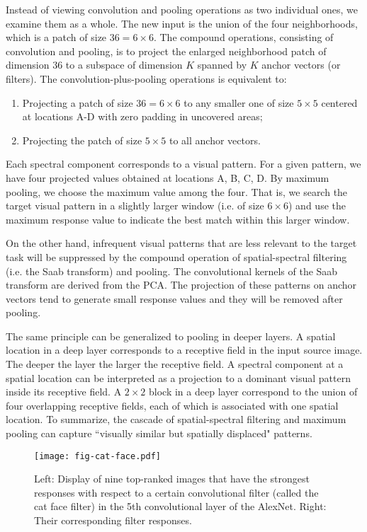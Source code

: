 \documentclass[preprint,12pt]{elsarticle}
\begin{document}
Instead of viewing convolution and pooling operations as two individual
ones, we examine them as a whole.  The new input is the union of the
four neighborhoods, which is a patch of size $36=6 \times 6$. The
compound operations, consisting of convolution and pooling, is to
project the enlarged neighborhood patch of dimension $36$ to a subspace
of dimension $K$ spanned by $K$ anchor vectors (or filters).  The
convolution-plus-pooling operations is equivalent to:
\begin{enumerate}
\item Projecting a patch of size $36=6 \times 6$ to any smaller one 
of size $5 \times 5$ centered at locations A-D with zero padding in
uncovered areas;
\item Projecting the patch of size $5 \times 5$ to all anchor vectors. 
\end{enumerate}
Each spectral component corresponds to a visual pattern. For a given
pattern, we have four projected values obtained at locations A, B, C, D.
By maximum pooling, we choose the maximum value among the four.  That
is, we search the target visual pattern in a slightly larger window
(i.e. of size $6 \times 6$) and use the maximum response value to
indicate the best match within this larger window. 

On the other hand, infrequent visual patterns that are less relevant to
the target task will be suppressed by the compound operation of
spatial-spectral filtering (i.e.  the Saab transform) and pooling. The
convolutional kernels of the Saab transform are derived from the PCA.
The projection of these patterns on anchor vectors tend to generate
small response values and they will be removed after pooling. 

The same principle can be generalized to pooling in deeper layers. A
spatial location in a deep layer corresponds to a receptive field in the
input source image.  The deeper the layer the larger the receptive
field. A spectral component at a spatial location can be interpreted as
a projection to a dominant visual pattern inside its receptive field.  A
$2 \times 2$ block in a deep layer correspond to the union of four
overlapping receptive fields, each of which is associated with one
spatial location.  To summarize, the cascade of spatial-spectral
filtering and maximum pooling can capture ``visually similar but
spatially displaced" patterns. 

\begin{figure}[htb]
\centering
\texttt{[image: fig-cat-face.pdf]}
\caption{Left: Display of nine top-ranked images that have the strongest
responses with respect to a certain convolutional filter (called the cat
face filter) in the 5th convolutional layer of the AlexNet. Right: Their
corresponding filter responses.}\label{fig:cat-face}
\end{figure}
\end{document}
